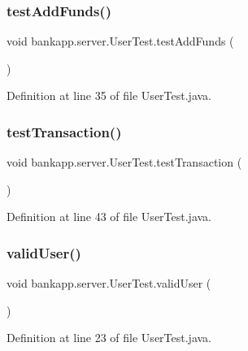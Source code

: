 \subsubsection{\texorpdfstring{test\+Add\+Funds()}{testAddFunds()}}
{\footnotesize\ttfamily void bankapp.\+server.\+User\+Test.\+test\+Add\+Funds (\begin{DoxyParamCaption}{ }\end{DoxyParamCaption})}



Definition at line 35 of file User\+Test.\+java.

\mbox{\label{classbankapp_1_1server_1_1_user_test_a5da66e25464ee57cb9e9246c9a026966}} 
\subsubsection{\texorpdfstring{test\+Transaction()}{testTransaction()}}
{\footnotesize\ttfamily void bankapp.\+server.\+User\+Test.\+test\+Transaction (\begin{DoxyParamCaption}{ }\end{DoxyParamCaption})}



Definition at line 43 of file User\+Test.\+java.

\mbox{\label{classbankapp_1_1server_1_1_user_test_a81e734600780565479bc7e3e9d58488f}} 
\subsubsection{\texorpdfstring{valid\+User()}{validUser()}}
{\footnotesize\ttfamily void bankapp.\+server.\+User\+Test.\+valid\+User (\begin{DoxyParamCaption}{ }\end{DoxyParamCaption})}



Definition at line 23 of file User\+Test.\+java.



